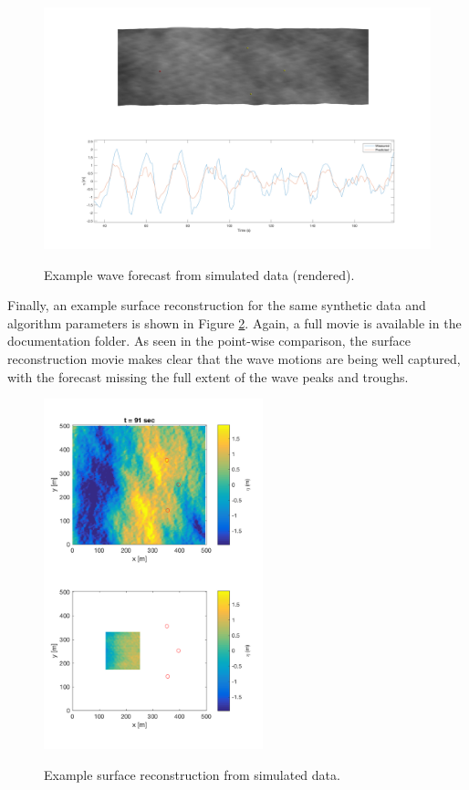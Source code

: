 \documentclass[11pt]{article}
\begin{document}
\begin{figure}[t]
    \centering
    \noindent\includegraphics[width=6.5in]{SimulationFrame_145.png}\\
   \vspace{-0in}\caption{Example wave forecast from simulated data (rendered).}\label{fig:Rendered}
\end{figure}

Finally, an example surface reconstruction for the same synthetic data and algorithm parameters is shown in Figure \ref{fig:SurfaceReconstruction}.  Again, a full movie is available in the documentation folder.  As seen in the point-wise comparison, the surface reconstruction movie makes clear that the wave motions are being well captured, with the forecast missing the full extent of the wave peaks and troughs. 

\begin{figure}[t]
    \centering
    \noindent\includegraphics[width=2.5in]{SurfacePrediction_057.png}\\
   \vspace{-0in}\caption{Example surface reconstruction from simulated data.}\label{fig:SurfaceReconstruction}
\end{figure}
\end{document}
